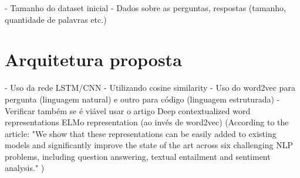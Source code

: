  - Tamanho do dataset inicial
 - Dados sobre as perguntas, respostas (tamanho, quantidade de palavras etc.)

\section{Arquitetura proposta} 

- Uso da rede LSTM/CNN 
       - Utilizando cosine similarity
       - Uso do word2vec para pergunta (linguagem natural) e outro para código (linguagem estruturada) - Verificar também se é viável usar o artigo Deep contextualized word representations ELMo representation (ao invés de word2vec) (According to the article: "We show that
these representations can be easily added to
existing models and significantly improve the
state of the art across six challenging NLP
problems, including question answering, textual entailment and sentiment analysis." )





